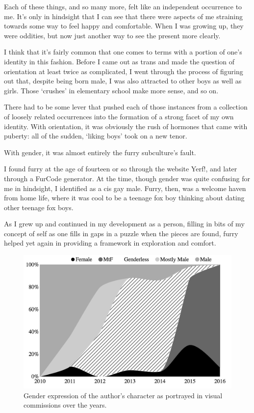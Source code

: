 Each of these things, and so many more, felt like an independent occurrence to me.  It's only in hindsight that I can see that there were aspects of me straining towards some way to feel happy and comfortable.  When I was growing up, they were oddities, but now just another way to see the present more clearly.

I think that it's fairly common that one comes to terms with a portion of one's identity in this fashion.  Before I came out as trans and made the question of orientation at least twice as complicated, I went through the process of figuring out that, despite being born male, I was also attracted to other boys as well as girls.  Those `crushes' in elementary school make more sense, and so on.

There had to be some lever that pushed each of those instances from a collection of loosely related occurrences into the formation of a strong facet of my own identity.  With orientation, it was obviously the rush of hormones that came with puberty: all of the sudden, `liking boys' took on a new tenor.

With gender, it was almost entirely the furry subculture's fault.

I found furry at the age of fourteen or so through the website Yerf!, and later through a FurCode generator.  At the time, though gender was quite confusing for me in hindsight, I identified as a cis gay male.  Furry, then, was a welcome haven from home life, where it was cool to be a teenage fox boy thinking about dating other teenage fox boys.

As I grew up and continued in my development as a person, filling in bits of my concept of self as one fills in gaps in a puzzle when the pieces are found, furry helped yet again in providing a framework in exploration and comfort.

\begin{figure}
  \centering
  \includegraphics[scale=0.65]{assets/commissions-sex-preview}
  \caption{Gender expression of the author's character as portrayed in visual commissions over the years.}
  \label{fig:commissions-sex}
\end{figure}

